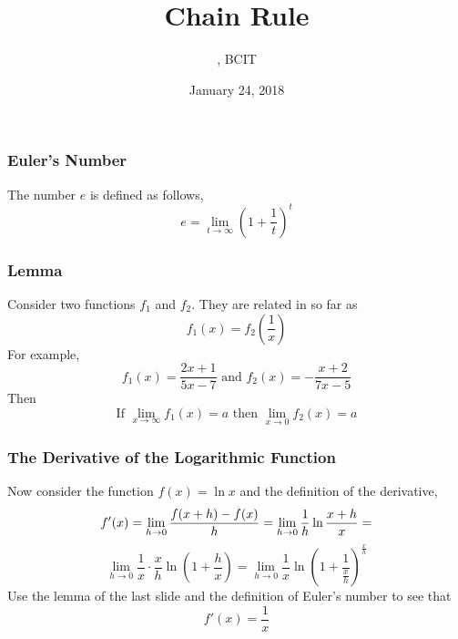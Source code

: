 \documentclass[xcolor=dvipsnames,handout]{beamer}
\title{Chain Rule}
\subtitle{{\CourseNumber}, BCIT}
\author{\CourseName}
\date{January 24, 2018}
\begin{document}
\begin{frame}
  \titlepage
\end{frame}

\begin{frame}
  \frametitle{Euler's Number}
The number $e$ is defined as follows,
\begin{equation}
  \label{eq:ciedaeme}
  e=\lim_{t\rightarrow\infty}\left(1+\frac{1}{t}\right)^{t}
\end{equation}
\end{frame}

\begin{frame}
  \frametitle{Lemma}
Consider two functions $f_{1}$ and $f_{2}$. They are related in so far
as
\begin{equation}
  \label{eq:ohquailo}
  f_{1}(x)=f_{2}\left(\frac{1}{x}\right)
\end{equation}
For example,
\begin{equation}
  \label{eq:seemaxah}
  f_{1}(x)=\frac{2x+1}{5x-7}\mbox{ and }f_{2}(x)=-\frac{x+2}{7x-5}
\end{equation}
Then
\begin{equation}
  \label{eq:iebieluk}
  \mbox{If }\lim_{x\rightarrow\infty}f_{1}(x)=a\mbox{ then }\lim_{x\rightarrow{}0}f_{2}(x)=a
\end{equation}
\end{frame}

\begin{frame}
  \frametitle{The Derivative of the Logarithmic Function}
Now consider the function $f(x)=\ln{}x$ and the definition of the
derivative,
\begin{equation}
  \label{eq:eeghaphe}
  f'(x)=\lim_{h\rightarrow{}0}\frac{f(x+h)-f(x)}{h}=\lim_{h\rightarrow{}0}\frac{1}{h}\ln\frac{x+h}{x}=\notag
\end{equation}
\begin{equation}
  \label{eq:quanoefe}
  \lim_{h\rightarrow{}0}\frac{1}{x}\cdot\frac{x}{h}\ln\left(1+\frac{h}{x}\right)=\lim_{h\rightarrow{}0}\frac{1}{x}\ln\left(1+\frac{1}{\frac{x}{h}}\right)^{\frac{x}{h}}
\end{equation}
Use the lemma of the last slide and the definition of Euler's number to see that
\begin{equation}
  \label{eq:oozeexei}
  f'(x)=\frac{1}{x}
\end{equation}
\end{frame}
\end{document}
